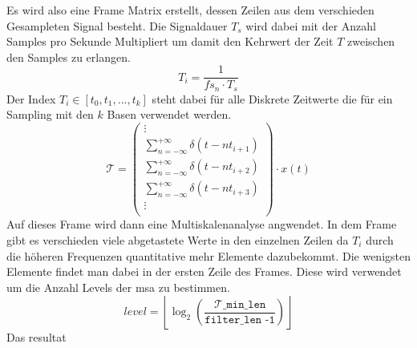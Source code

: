 Es wird also eine Frame Matrix erstellt, dessen Zeilen aus dem verschieden Gesampleten Signal besteht. Die Signaldauer $T_{s}$ wird dabei mit der Anzahl Samples pro Sekunde Multipliert um damit den Kehrwert der Zeit $T$ zweischen den Samples zu erlangen.
\[T_{i}=\frac{1}{fs_{n}\cdot T_{s}}\]
Der Index $T_{i}\in[t_{0},t_{1},...,t_{k}]$ steht dabei für alle Diskrete Zeitwerte die für ein Sampling mit den $k$ Basen verwendet werden.
\[
\mathcal{T}
=
\begin{pmatrix}
\vdots\\
\sum_{n=-\infty}^{+\infty} \delta(t - nt_{i+1})\\
\sum_{n=-\infty}^{+\infty} \delta(t - nt_{i+2})\\
\sum_{n=-\infty}^{+\infty} \delta(t - nt_{i+3})\\
\vdots\\
\end{pmatrix}
\cdot x(t)
\]
Auf dieses Frame wird dann eine Multiskalenanalyse angwendet. In dem Frame gibt es verschieden viele abgetastete Werte in den einzelnen Zeilen da $T_{i}$ durch die höheren Frequenzen quantitative mehr Elemente dazubekommt. Die wenigsten Elemente findet man dabei in der ersten Zeile des Frames. Diese wird verwendet um die Anzahl Levels der msa zu bestimmen. 
\[level = \left\lfloor\log_2\left(\mathtt{
	\frac{\mathcal{T}\_\text{min\_len}}{\text{filter\_len -1}}}\right)\right\rfloor
\]
Das resultat 


